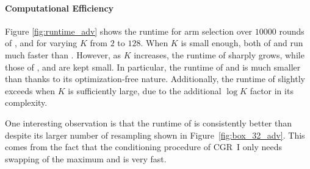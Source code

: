 
\paragraph{Computational Efficiency}
Figure \ref{fig:runtime_adv} shows the runtime for arm selection
over $10000$ rounds
of {}, {} and {} for varying $K$ from $2$ to $128$.
When $K$ is small enough, both of {} and {} run much faster than {}.
However, as $K$ increases,
the runtime of {} sharply grows,
while those of {}, {} and {} are kept small.
In particular, the runtime of {} and {} is much smaller than {} thanks to its optimization-free nature. Additionally, the runtime of {} slightly exceeds {} when $K$ is sufficiently large, due to the additional $\log K$ factor in its complexity.

One interesting observation is that the runtime of {} is consistently better than {} despite its larger number
of resampling shown in Figure~\ref{fig:box_32_adv}.
This comes from the fact that the conditioning procedure of CGR~I only needs swapping of the maximum and is very fast.




